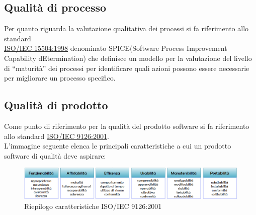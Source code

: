 \documentclass[a4paper,11pt]{article}
\begin{document}
\subsection{Qualità di processo}
Per quanto riguarda la valutazione qualitativa dei processi si fa riferimento allo standard\\ \underline{ISO/IEC 15504:1998} denominato SPICE\addglos (Software Process Improvement Capability dEtermination) che definisce un modello per la valutazione del livello di “maturità”
dei processi per identificare quali azioni possono essere necessarie per migliorare un processo specifico.

\subsection{Qualità di prodotto}
Come punto di riferimento per la qualità del prodotto software si fa riferimento allo standard \underline{ISO/IEC 9126:2001}.\\
L'immagine seguente elenca le principali caratteristiche a cui un prodotto software di qualità deve aspirare:\\
\begin{figure}[h!]
\centering
\includegraphics[scale=0.55]{../images/ISO-9126-cut}
\caption{Riepilogo caratteristiche ISO/IEC 9126:2001}
\end{figure}
\end{document}
